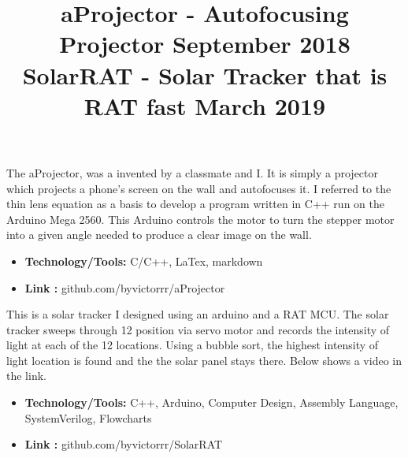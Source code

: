 \documentclass[margin]{res}
\begin{document}
\begin{resume}
{%
\location{}
\title{\textbf{aProjector - Autofocusing Projector \hfill September 2018}}
\begin{position}
 The aProjector, was a invented by a classmate and I. It is simply a projector which projects a phone’s screen on the wall and autofocuses it. I referred to the thin lens equation as a basis to develop a program written in C++ run on the Arduino Mega 2560. This Arduino controls the motor to turn the stepper motor into a given angle needed to produce a clear image on the wall.
\begin{itemize}
\item \textbf{Technology/Tools:} C/C++, LaTex, markdown
\end{itemize}
\begin{itemize}
\item \textbf{Link :} github.com/byvictorrr/aProjector
\end{itemize}
\end{position}




\location{}
\title{\textbf{ SolarRAT - Solar Tracker that is RAT fast  \hfill March 2019}}
\begin{position}
 This is a solar tracker I designed using an arduino and a RAT MCU. The solar tracker sweeps through 12 position via servo motor and records the intensity of light at each of the 12 locations. Using a bubble sort, the highest intensity of light location is found and the the solar panel stays there. Below shows a video in the link.
\begin{itemize}
\item \textbf{Technology/Tools:} C++, Arduino, Computer Design, Assembly Language, SystemVerilog, Flowcharts
\end{itemize}
\begin{itemize}
\item \textbf{Link :} github.com/byvictorrr/SolarRAT
\end{itemize}
\end{position}

}
\end{resume}
\end{document}
